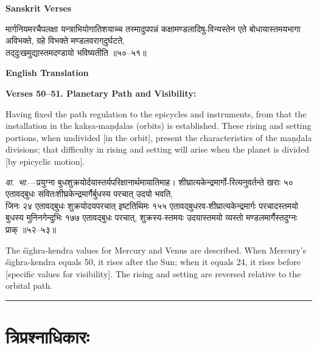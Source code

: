\documentclass[11pt,a4paper]{article}
\newcommand{\longline}{\noindent\rule{\textwidth}{0.4pt}}
\newcommand{\dev}[1]{{\devanagarifont #1}}
\newcommand{\sectsep}{\par\vspace{0.8em}\longline\vspace{0.8em}}
\begin{document}
\begin{minipage}[t]{0.48\textwidth}
\textbf{\small Sanskrit Verses}

\small\devanagarifont
मार्गनियमरचैपलक्षा यन्त्राभियोगातिशयाच्च तस्मादुपपन्नं कक्षामण्डलादिषु-विन्यस्तेन एते बोधायास्तमयभागा अविभक्ते, ग्रहे विभक्ते मण्डलवराग्‌दुर्घटते,\\
तद्‌दुःखमुद्यास्तमदण्डायो भविष्यतीति ॥५०--५१॥
\end{minipage}%
\hfill
\begin{minipage}[t]{0.48\textwidth}
\textbf{\small English Translation}

\textbf{Verses 50--51. Planetary Path and Visibility:}

Having fixed the path regulation to the epicycles and instruments, from that the installation in the kak\d{s}a-ma\d{n}\d{d}alas (orbits) is established. These rising and setting portions, when undivided [in the orbit], present the characteristics of the ma\d{n}\d{d}ala divisions; that difficulty in rising and setting will arise when the planet is divided [by epicyclic motion].
\end{minipage}

\vspace{0.5em}
\begin{minipage}[t]{0.48\textwidth}
\small\devanagarifont
\textit{वा.~भा.}---प्रयुग्ना बुधशुक्रयोर्दयास्तर्यपरिक्षानार्थमायातिमाह। शीघ्रात्यकेन्‍द्रमार्गो-रित्यनुवर्तन्ते खराः ५० एतावद्‌बुधः सवितःशीघ्रकेन्‍द्रमार्गैर्बुधस्य परचात् उदयो भवति,\\
जिनः २४ एतावद्‌बुधः शुक्रयोदयपरचात् इष्टतिथिमः १५५ एतावद्‌बुधरव-शीघ्रात्यकेन्‍द्रमार्गः परचादस्तमयो बुधस्य मुनिनगेन्‍दुभिः १७७ एतावद्‌बुधः परचात्, शुक्रस्य-स्तमयः उदयास्तमयो व्यस्तो मण्डलमार्गैस्तदुग्नः प्राक् ॥५२--५३॥
\end{minipage}%
\hfill
\begin{minipage}[t]{0.48\textwidth}
\small
The \'s\=ighra-kendra values for Mercury and Venus are described. When Mercury's \'s\=ighra-kendra equals 50, it rises after the Sun; when it equals 24, it rises before [specific values for visibility]. The rising and setting are reversed relative to the orbital path.
\end{minipage}

\sectsep

\section{\dev{त्रिप्रश्नाधिकारः}}
\end{document}
